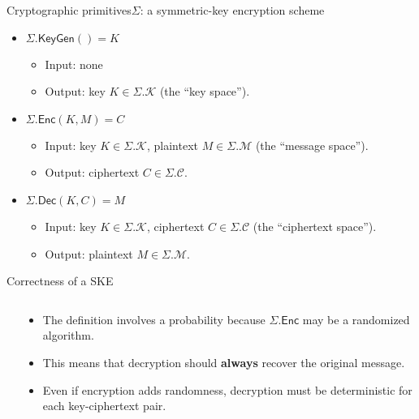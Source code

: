 \documentclass[aspectratio=169, lualatex, handout]{beamer}
\begin{document}
\begin{frame}{Cryptographic primitives}{$\Sigma$: a symmetric-key encryption scheme}
	\begin{itemize}
		\item \textbf{$\Sigma.\textsf{KeyGen}() = K$}
		      \begin{itemize}
			      \item Input: none
			      \item Output: key $K \in \Sigma.\mathcal{K}$ {\tiny(the ``key space'')}.
		      \end{itemize}
		\item \textbf{$\Sigma.\textsf{Enc}(K, M) = C$}
		      \begin{itemize}
			      \item Input: key $K \in \Sigma.\mathcal{K}$, plaintext $M \in \Sigma.\mathcal{M}$ {\tiny(the ``message space'')}.
			      \item Output: ciphertext $C \in \Sigma.\mathcal{C}$.
		      \end{itemize}
		\item \textbf{$\Sigma.\textsf{Dec}(K, C) = M$}
		      \begin{itemize}
			      \item Input: key $K \in \Sigma.\mathcal{K}$, ciphertext $C \in \Sigma.\mathcal{C}$ {\tiny(the ``ciphertext space'')}.
			      \item Output: plaintext $M \in \Sigma.\mathcal{M}$.
		      \end{itemize}
	\end{itemize}
\end{frame}

\begin{frame}{Correctness of a SKE}
	\begin{columns}[c]
		\begin{column}{0.5\textwidth}
		\end{column}
		\begin{column}{0.5\textwidth}
			\begin{itemize}[<+->]
				\item The definition involves a probability because $\Sigma.\textsf{Enc}$ may be a randomized algorithm.
				\item This means that decryption should \textbf{always} recover the original message.
				\item Even if encryption adds randomness, decryption must be deterministic for each key-ciphertext pair.
			\end{itemize}
		\end{column}
	\end{columns}
\end{frame}
\end{document}
